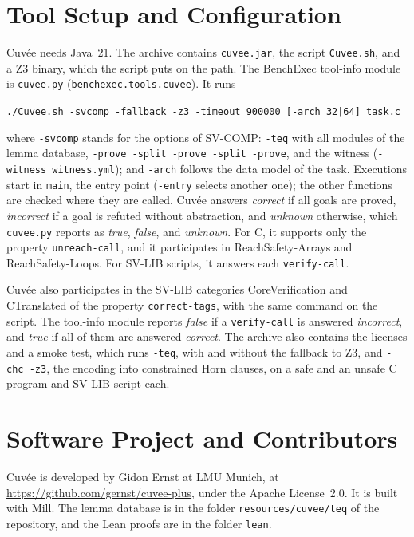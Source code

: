\documentclass[runningheads]{llncs}
\newcommand{\cuvee}{Cuvée}
\newcommand{\code}[1]{\texttt{#1}}
\begin{document}
\section{Tool Setup and Configuration}

\cuvee{} needs Java~21. The archive contains \code{cuvee.jar}, the script \code{Cuvee.sh}, and a Z3
binary, which the script puts on the path. The BenchExec tool-info module is \code{cuvee.py} (\code{benchexec.tools.cuvee}). It runs
\begin{center}
\small\code{./Cuvee.sh -svcomp -fallback -z3 -timeout 900000 [-arch 32|64] task.c}
\end{center}
where \code{-svcomp} stands for the options of SV-COMP: \code{-teq} with all modules of the lemma
database, \code{-prove -split -prove -split -prove}, and the witness (\code{-witness witness.yml}); and
\code{-arch} follows the data model of the task. Executions start in \code{main}, the entry point
(\code{-entry} selects another one); the other functions are checked where they are called. \cuvee{} answers
\emph{correct} if all goals are proved, \emph{incorrect} if a goal is refuted without abstraction, and
\emph{unknown} otherwise, which \code{cuvee.py} reports as \emph{true}, \emph{false}, and \emph{unknown}.
For C, it supports only the property \code{unreach-call}, and it participates in ReachSafety-Arrays and
ReachSafety-Loops. For SV-LIB scripts, it answers each \code{verify-call}.

\cuvee{} also participates in the SV-LIB categories CoreVerification and CTranslated of the property
\code{correct-tags}, with the same command on the script. The tool-info module reports \emph{false}
if a \code{verify-call} is answered \emph{incorrect}, and \emph{true} if all of them are answered
\emph{correct}. The archive also contains the licenses and a smoke test, which runs \code{-teq}, with
and without the fallback to Z3, and \code{-chc -z3}, the encoding into constrained Horn clauses, on a
safe and an unsafe C program and SV-LIB script each.

\section{Software Project and Contributors}

\cuvee{} is developed by Gidon Ernst at LMU Munich, at
\url{https://github.com/gernst/cuvee-plus}, under the Apache License~2.0. It is built with Mill.
The lemma database is in the folder \code{resources/cuvee/teq} of the repository, and the
Lean proofs are in the folder \code{lean}.
\end{document}
